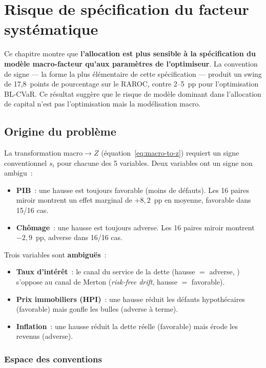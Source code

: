 \documentclass[12pt, a4paper, twoside, openright]{report}
\theoremstyle{definition}
\begin{document}
\chapter{Risque de spécification du facteur systématique}
\label{chap:conventions}

Ce chapitre montre que \textbf{l'allocation est plus sensible à la spécification du modèle macro-facteur qu'aux paramètres de l'optimiseur}. La convention de signe --- la forme la plus élémentaire de cette spécification --- produit un swing de 17,8~points de pourcentage sur le RAROC, contre 2--5~pp pour l'optimisation BL-CVaR. Ce résultat suggère que le risque de modèle dominant dans l'allocation de capital n'est pas l'optimisation mais la modélisation macro.

\section{Origine du problème}
\label{sec:conv-origine}

La transformation macro$\to Z$ (équation~\ref{eq:macro-to-z}) requiert un signe conventionnel $s_i$ pour chacune des 5 variables. Deux variables ont un signe non ambigu~:

\begin{itemize}
\item \textbf{PIB}~: une hausse est toujours favorable (moins de défauts). Les 16 paires miroir montrent un effet marginal de $+8{,}2$~pp en moyenne, favorable dans 15/16 cas.
\item \textbf{Chômage}~: une hausse est toujours adverse. Les 16 paires miroir montrent $-2{,}9$~pp, adverse dans 16/16 cas.
\end{itemize}

Trois variables sont \textbf{ambiguës}~:

\begin{itemize}
\item \textbf{Taux d'intérêt}~: le canal du service de la dette (hausse $=$ adverse, \citealt{duffie2007}) s'oppose au canal de Merton (\textit{risk-free drift}, hausse $=$ favorable).
\item \textbf{Prix immobiliers (HPI)}~: une hausse réduit les défauts hypothécaires (favorable) mais gonfle les bulles (adverse à terme).
\item \textbf{Inflation}~: une hausse réduit la dette réelle (favorable) mais érode les revenus (adverse).
\end{itemize}

\subsection{Espace des conventions}
\end{document}
